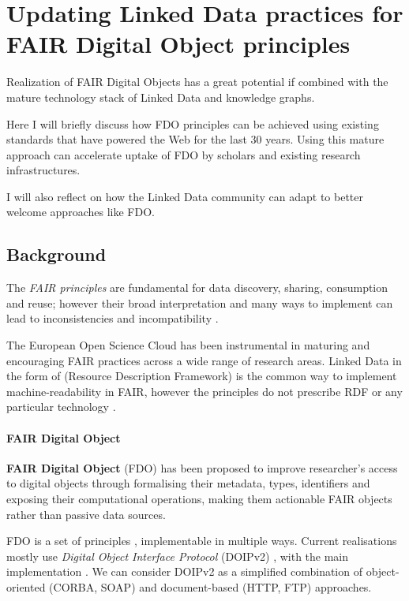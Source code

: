\section{Updating Linked Data practices for FAIR Digital Object principles}
\label{ch2:updating-linked-data-practices-for-fair-digital-object-principles}

Realization of FAIR Digital Objects has a great potential if combined with the mature technology stack of Linked Data and knowledge graphs.

Here I will briefly discuss how FDO principles can be achieved using existing standards that have powered the Web for the last 30 years. Using this mature approach can accelerate uptake of FDO by scholars and existing research infrastructures.

I will also reflect on how the Linked Data community can adapt to better welcome approaches like FDO.

\subsection{Background}
\label{ch2:background}

The \emph{FAIR principles} \cite{Wilkinson 2016} are
fundamental for data discovery, sharing, consumption and reuse; however
their broad interpretation and many ways to implement can lead to
inconsistencies and incompatibility
\cite{Jacobsen 2020}.

The European Open Science Cloud  has
been instrumental in maturing and encouraging FAIR practices across a
wide range of research areas. Linked Data in the form of
 (Resource Description
Framework) is the common way to implement machine-readability in FAIR,
however the principles do not prescribe RDF or any particular technology
\cite{Mons 2017}.

\paragraph{FAIR Digital Object}
\label{ch2:fair-digital-object}

\textbf{FAIR Digital Object} (FDO)
\cite{Schultes 2019}
has been proposed to improve researcher's access to digital objects
through formalising their metadata, types, identifiers and exposing
their computational operations, making them actionable FAIR objects
rather than passive data sources.

FDO is a set of principles \cite{bonino2019}, implementable in multiple ways. Current realisations mostly
use \emph{Digital Object Interface Protocol} (DOIPv2)
\cite{DONA 2018}, with the
main implementation
. We
can consider DOIPv2 as a simplified combination of object-oriented
(CORBA, SOAP) and document-based (HTTP, FTP) approaches.

